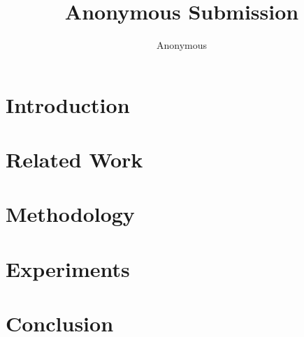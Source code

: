 \documentclass[10pt,twocolumn,letterpaper]{article}
\title{Anonymous Submission}
\author{Anonymous}
\begin{document}
\maketitle

\begin{abstract}
\end{abstract}

\section{Introduction}
\label{sec:intro}

\section{Related Work}
\label{sec:related_work}

\section{Methodology}
\label{sec:method}

\section{Experiments}
\label{sec:experiments}

\section{Conclusion}
\label{sec:conclusion}

{
    \small
    
    
}

\end{document}
